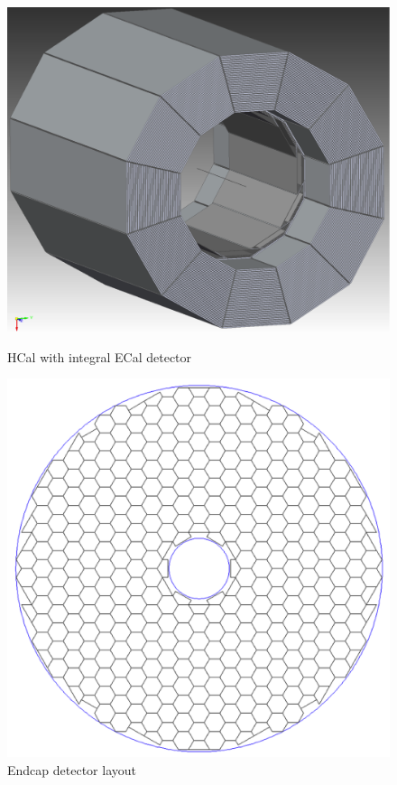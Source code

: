 \begin{figure}
	\begin{minipage}[b]{.49\textwidth}
		\includegraphics[width=\linewidth]{Calorimeter/SiliconTungstenSiD/HCalECal}
		\caption{HCal with integral ECal detector}
		\label{fig:Calorimeter:SiDECAL:HCalECal}
	\end{minipage}\hfill
	\begin{minipage}[b]{.49\textwidth}
		\includegraphics[width=\linewidth]{Calorimeter/SiliconTungstenSiD/endcapLayout}
		\caption{Endcap detector layout}
		\label{fig:Calorimeter:SiDECAL:endcapLayout}
	\end{minipage}
\end{figure}

